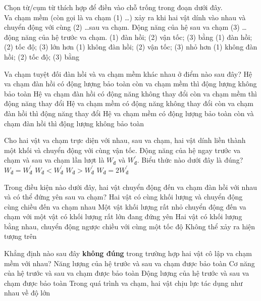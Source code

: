 \begin{ex}
	Chọn từ/cụm từ thích hợp để điền vào chỗ trống trong đoạn dưới đây.\\
	Va chạm mềm (còn gọi là va chạm (1) \dots) xảy ra khi hai vật dính vào nhau và chuyển động với cùng (2) \dots sau va chạm. Động năng của hệ sau va chạm (3) \dots động năng của hệ trước va chạm.
	\choice
	{(1) đàn hồi; (2) vận tốc; (3) bằng}
	{(1) đàn hồi; (2) tốc độ; (3) lớn hơn}
	{\True (1) không đàn hồi; (2) vận tốc; (3) nhỏ hơn}
	{(1) không đàn hồi; (2) tốc độ; (3) bằng}
	\loigiai{}
\end{ex}
\begin{ex}
	Va chạm tuyệt đối đàn hồi và va chạm mềm khác nhau ở điểm nào sau đây?
	\choice
	{Hệ va chạm đàn hồi có động lượng bảo toàn còn va chạm mềm thì động lượng không bảo toàn}
	{\True Hệ va chạm đàn hồi có động năng không thay đổi còn va chạm mềm thì động năng thay đổi}
	{Hệ va chạm mềm có động năng không thay đổi còn va chạm đàn hồi thì động năng thay đổi}
	{Hệ va chạm mềm có động lượng bảo toàn còn và chạm đàn hồi thì động lượng không bảo toàn}
	\loigiai{}
\end{ex}
\begin{ex}
	Cho hai vật va chạm trực diện với nhau, sau va chạm, hai vật dính liền thành một khối và chuyển động với cùng vận tốc. Động năng của hệ ngay trước va chạm và sau va chạm lần lượt là $W_{\text{đ}}$ và $W^\prime_{\text{đ}}$. Biểu thức nào dưới đây là đúng?
	\choice
	{$W_{\text{đ}}=W^\prime_{\text{đ}}$}
	{$W_{\text{đ}}<W^\prime_{\text{đ}}$}
	{\True $W_{\text{đ}}>W^\prime_{\text{đ}}$}
	{$W_{\text{đ}}=2W^\prime_{\text{đ}}$}
	\loigiai{}
\end{ex}
\begin{ex}
	Trong điều kiện nào dưới đây, hai vật chuyển động đến va chạm đàn hồi với nhau và có thể đứng yên sau va chạm?
	\choice
	{Hai vật có cùng khối lượng và chuyển động cùng chiều đến va chạm nhau}
	{Một vật khối lượng rất nhỏ chuyển động đến va chạm với một vật có khối lượng rất lớn đang đứng yên}
	{Hai vật có khối lượng bằng nhau, chuyển động ngược chiều với cùng một tốc độ}
	{\True Không thể xảy ra hiện tượng trên}
	\loigiai{}
\end{ex}
\begin{ex}
	Khẳng định nào sau đây \textbf{không đúng} trong trường hợp hai vật cô lập va chạm mềm với nhau?
	\choice
	{Năng lượng của hệ trước và sau va chạm được bảo toàn}
	{\True Cơ năng của hệ trước và sau va chạm được bảo toàn}
	{Động lượng của hệ trước và sau va chạm được bảo toàn}
	{Trong quá trình va chạm, hai vật chịu lực tác dụng như nhau về độ lớn}
	\loigiai{}
\end{ex}
